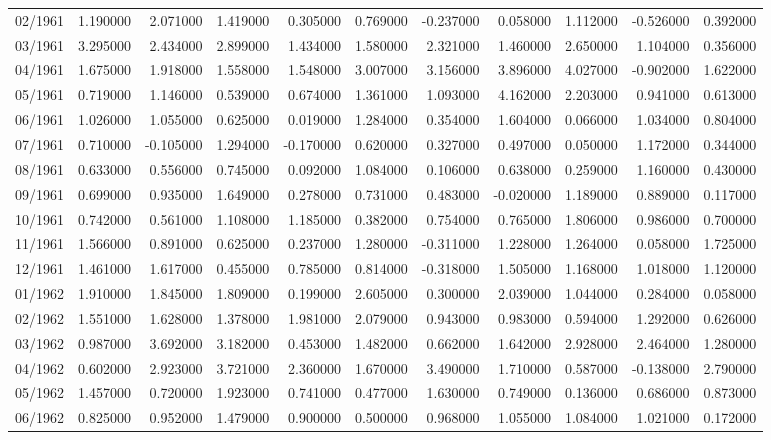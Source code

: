 \begin{tabular}{lrrrrrrrrrr}
02/1961 & 1.190000 & 2.071000 & 1.419000 & 0.305000 & 0.769000 & -0.237000 & 0.058000 & 1.112000 & -0.526000 & 0.392000 \\
03/1961 & 3.295000 & 2.434000 & 2.899000 & 1.434000 & 1.580000 & 2.321000 & 1.460000 & 2.650000 & 1.104000 & 0.356000 \\
04/1961 & 1.675000 & 1.918000 & 1.558000 & 1.548000 & 3.007000 & 3.156000 & 3.896000 & 4.027000 & -0.902000 & 1.622000 \\
05/1961 & 0.719000 & 1.146000 & 0.539000 & 0.674000 & 1.361000 & 1.093000 & 4.162000 & 2.203000 & 0.941000 & 0.613000 \\
06/1961 & 1.026000 & 1.055000 & 0.625000 & 0.019000 & 1.284000 & 0.354000 & 1.604000 & 0.066000 & 1.034000 & 0.804000 \\
07/1961 & 0.710000 & -0.105000 & 1.294000 & -0.170000 & 0.620000 & 0.327000 & 0.497000 & 0.050000 & 1.172000 & 0.344000 \\
08/1961 & 0.633000 & 0.556000 & 0.745000 & 0.092000 & 1.084000 & 0.106000 & 0.638000 & 0.259000 & 1.160000 & 0.430000 \\
09/1961 & 0.699000 & 0.935000 & 1.649000 & 0.278000 & 0.731000 & 0.483000 & -0.020000 & 1.189000 & 0.889000 & 0.117000 \\
10/1961 & 0.742000 & 0.561000 & 1.108000 & 1.185000 & 0.382000 & 0.754000 & 0.765000 & 1.806000 & 0.986000 & 0.700000 \\
11/1961 & 1.566000 & 0.891000 & 0.625000 & 0.237000 & 1.280000 & -0.311000 & 1.228000 & 1.264000 & 0.058000 & 1.725000 \\
12/1961 & 1.461000 & 1.617000 & 0.455000 & 0.785000 & 0.814000 & -0.318000 & 1.505000 & 1.168000 & 1.018000 & 1.120000 \\
01/1962 & 1.910000 & 1.845000 & 1.809000 & 0.199000 & 2.605000 & 0.300000 & 2.039000 & 1.044000 & 0.284000 & 0.058000 \\
02/1962 & 1.551000 & 1.628000 & 1.378000 & 1.981000 & 2.079000 & 0.943000 & 0.983000 & 0.594000 & 1.292000 & 0.626000 \\
03/1962 & 0.987000 & 3.692000 & 3.182000 & 0.453000 & 1.482000 & 0.662000 & 1.642000 & 2.928000 & 2.464000 & 1.280000 \\
04/1962 & 0.602000 & 2.923000 & 3.721000 & 2.360000 & 1.670000 & 3.490000 & 1.710000 & 0.587000 & -0.138000 & 2.790000 \\
05/1962 & 1.457000 & 0.720000 & 1.923000 & 0.741000 & 0.477000 & 1.630000 & 0.749000 & 0.136000 & 0.686000 & 0.873000 \\
06/1962 & 0.825000 & 0.952000 & 1.479000 & 0.900000 & 0.500000 & 0.968000 & 1.055000 & 1.084000 & 1.021000 & 0.172000 \\

\end{tabular}
